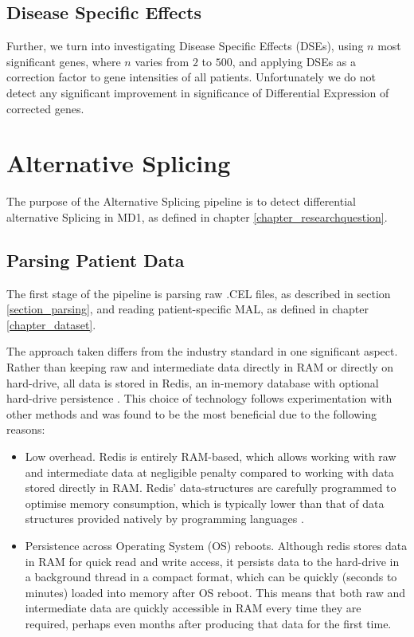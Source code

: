 \subsection{Disease Specific Effects}

Further, we turn into investigating Disease Specific Effects (DSEs), using $n$ most significant genes, where $n$ varies from $2$ to $500$, and applying DSEs as a correction factor to gene intensities of all patients. Unfortunately we do not detect any significant improvement in significance of Differential Expression of corrected genes.

\section{Alternative Splicing} \label{chapter_altersplice}

The purpose of the Alternative Splicing pipeline is to detect differential alternative Splicing in MD1, as defined in chapter \ref{chapter_researchquestion}.

\subsection{Parsing Patient Data} \label{section_parsingpatientdata}

The first stage of the pipeline is parsing raw .CEL files, as described in section \ref{section_parsing}, and reading patient-specific MAL, as defined in chapter \ref{chapter_dataset}.

The approach taken differs from the industry standard in one significant aspect. Rather than keeping raw and intermediate data directly in RAM or directly on hard-drive, all data is stored in Redis, an in-memory database with optional hard-drive persistence \parencite{redis2017}. This choice of technology follows experimentation with other methods and was found to be the most beneficial due to the following reasons:

\begin{itemize}
\item Low overhead. Redis is entirely RAM-based, which allows working with raw and intermediate data at negligible penalty compared to working with data stored directly in RAM. Redis' data-structures are carefully programmed to optimise memory consumption, which is typically lower than that of data structures provided natively by programming languages \parencite[adam]{redis2017}.
\item Persistence across Operating System (OS) reboots. Although redis stores data in RAM for quick read and write access, it persists data to the hard-drive in a background thread in a compact format, which can be quickly (seconds to minutes) loaded into memory after OS reboot. This means that both raw and intermediate data are quickly accessible in RAM every time they are required, perhaps even months after producing that data for the first time.
\end{itemize}

